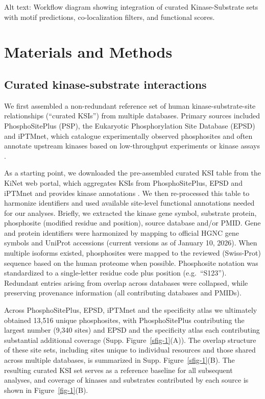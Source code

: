 \documentclass[
  number,
  preprint,
  onecolumn]{elsarticle}
\begin{document}
Alt text: Workflow diagram showing integration of curated
Kinase-Substrate sets with motif predictions, co-localization filters,
and functional scores.

\section{Materials and Methods}\label{materials-and-methods}

\subsection{Curated kinase-substrate
interactions}\label{curated-kinase-substrate-interactions}

We first assembled a non-redundant reference set of human
kinase-substrate-site relationships (``curated KSIs'') from multiple
databases. Primary sources included PhosphoSitePlus (PSP), the
Eukaryotic Phosphorylation Site Database (EPSD) and iPTMnet, which
catalogue experimentally observed phosphosites and often annotate
upstream kinases based on low-throughput experiments or kinase assays
\citep{Hornbeck2015-dg, Chen2025-bt, Huang2018-bq}.

As a starting point, we downloaded the pre-assembled curated KSI table
from the KiNet web portal, which aggregates KSIs from PhosphoSitePlus,
EPSD and iPTMnet and provides kinase annotations \citep{Sekar2024-nx}.
We then re-processed this table to harmonize identifiers and used
available site-level functional annotations needed for our analyses.
Briefly, we extracted the kinase gene symbol, substrate protein,
phosphosite (modified residue and position), source database and/or
PMID. Gene and protein identifiers were harmonized by mapping to
official HGNC gene symbols and UniProt accessions (current versions as
of January 10, 2026). When multiple isoforms existed, phosphosites were
mapped to the reviewed (Swiss-Prot) sequence based on the human proteome
when possible. Phosphosite notation was standardized to a single-letter
residue code plus position (e.g.~``S123''). Redundant entries arising
from overlap across databases were collapsed, while preserving
provenance information (all contributing databases and PMIDs).

Across PhosphoSitePlus, EPSD, iPTMnet and the specificity atlas we
ultimately obtained 13,516 unique phosphosites, with PhosphoSitePlus
contributing the largest number (9,340 sites) and EPSD and the
specificity atlas each contributing substantial additional coverage
(Supp. Figure~\ref{sfig-1}(A)). The overlap structure of these site
sets, including sites unique to individual resources and those shared
across multiple databases, is summarized in
Supp. Figure~\ref{sfig-1}(B). The resulting curated KSI set serves as a
reference baseline for all subsequent analyses, and coverage of kinases
and substrates contributed by each source is shown in
Figure~\ref{fig-1}(B).
\end{document}
